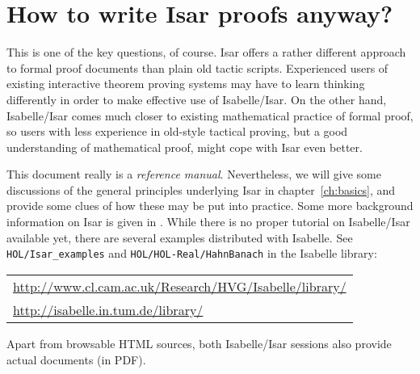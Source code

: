 \section{How to write Isar proofs anyway?}

This is one of the key questions, of course.  Isar offers a rather different
approach to formal proof documents than plain old tactic scripts.  Experienced
users of existing interactive theorem proving systems may have to learn
thinking differently in order to make effective use of Isabelle/Isar.  On the
other hand, Isabelle/Isar comes much closer to existing mathematical practice
of formal proof, so users with less experience in old-style tactical proving,
but a good understanding of mathematical proof, might cope with Isar even
better.

This document really is a \emph{reference manual}.  Nevertheless, we will give
some discussions of the general principles underlying Isar in
chapter~\ref{ch:basics}, and provide some clues of how these may be put into
practice.  Some more background information on Isar is given in
\cite{Wenzel:1999:TPHOL}.  While there is no proper tutorial on Isabelle/Isar
available yet, there are several examples distributed with Isabelle.  See
\texttt{HOL/Isar_examples} and \texttt{HOL/HOL-Real/HahnBanach} in the
Isabelle library:

\begin{center}\small
  \begin{tabular}{l}
    \url{http://www.cl.cam.ac.uk/Research/HVG/Isabelle/library/} \\
    \url{http://isabelle.in.tum.de/library/} \\
  \end{tabular}
\end{center}

Apart from browsable HTML sources, both Isabelle/Isar sessions also provide
actual documents (in PDF).

